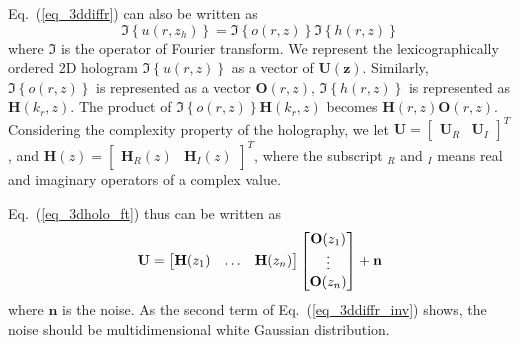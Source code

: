 \documentclass[9pt,twocolumn,twoside]{osajnl}
\begin{document}
Eq.~(\ref{eq_3ddiffr}) can also be written as
\begin{equation}
\Im\left\{u(r,z_h)\right\} = \Im\left\{o(r,z)\right\} \Im\left\{h(r,z)\right\} \label{eq_3dholo_ft}
\end{equation}
where $\Im$ is the operator of Fourier transform.
We represent the lexicographically ordered 2D hologram $\Im\left\{u(r,z)\right\}$ as a vector of $\mathbf{U(z)}$. 
Similarly, $\Im\left\{o(r,z)\right\}$ is represented as a vector $\mathbf{O}(r,z)$, $\Im\left\{h(r,z)\right\}$ is represented as $\mathbf{H}(k_r, z)$.
The product of $\Im\left\{o(r,z)\right\} \mathbf{H}(k_r, z)$ becomes $\mathbf{H}(r,z)\mathbf{O}(r,z)$.
Considering the complexity property of the holography, we let  $\mathbf{U}=\begin{bmatrix}\mathbf{U}_R & \mathbf{U}_I \end{bmatrix}^T$, and $\mathbf{H}(z)=\begin{bmatrix}\mathbf{H}_R(z) & \mathbf{H}_I(z) \end{bmatrix}^T$, where the subscript $_R$ and $_I$ means real and imaginary operators of a complex value.

Eq.~(\ref{eq_3dholo_ft}) thus can be written as
\begin{equation}
\mathbf{U} \\ 
=\begin{bmatrix}
\mathbf{H}(z_1) & \dots & \mathbf{H}(z_n) \\
\end{bmatrix}
\begin{bmatrix}
\mathbf{O}(z_1) \\ 
\vdots  \\
\mathbf{O}(z_n)\\  
\end{bmatrix} + \mathbf{n}
\end{equation}
where $\mathbf{n}$ is the noise. As the second term of Eq.~(\ref{eq_3ddiffr_inv}) shows, the noise should be multidimensional white Gaussian distribution.
\end{document}

